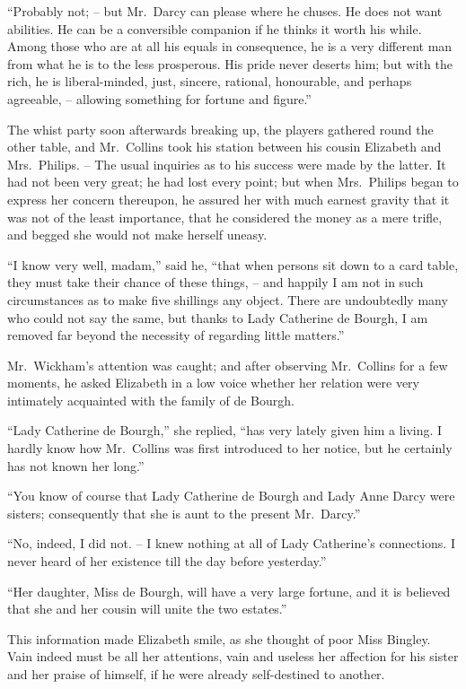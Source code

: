 “Probably not; -- but Mr.\ Darcy can please where he
chuses. He does not want abilities. He can be a conversible
companion if he thinks it worth his while. Among
those who are at all his equals in consequence, he is a very
different man from what he is to the less prosperous.
His pride never deserts him; but with the rich, he is
liberal-minded, just, sincere, rational, honourable, and
perhaps agreeable, -- allowing something for fortune and
figure.”

The whist party soon afterwards breaking up, the players
gathered round the other table, and Mr.\ Collins took his
station between his cousin Elizabeth and Mrs.\ Philips. -- The
usual inquiries as to his success were made by the latter.
It had not been very great; he had lost every point;
but when Mrs.\ Philips began to express her concern thereupon,
he assured her with much earnest gravity that it
was not of the least importance, that he considered the
money as a mere trifle, and begged she would not make
herself uneasy.

“I know very well, madam,” said he, “that when
persons sit down to a card table, they must take their
chance of these things, -- and happily I am not in such
circumstances as to make five shillings any object. There
are undoubtedly many who could not say the same, but
thanks to Lady Catherine de Bourgh, I am removed far
beyond the necessity of regarding little matters.”

Mr.\ Wickham’s attention was caught; and after observing
Mr.\ Collins for a few moments, he asked Elizabeth in
a low voice whether her relation were very intimately
acquainted with the family of de Bourgh.

“Lady Catherine de Bourgh,” she replied, “has very
lately given him a living. I hardly know how Mr.\ Collins
was first introduced to her notice, but he certainly has
not known her long.”

“You know of course that Lady Catherine de Bourgh
and Lady Anne Darcy were sisters; consequently that
she is aunt to the present Mr.\ Darcy.”

“No, indeed, I did not. -- I knew nothing at all of Lady
Catherine’s connections. I never heard of her existence
till the day before yesterday.”

“Her daughter, Miss de Bourgh, will have a very large
fortune, and it is believed that she and her cousin will
unite the two estates.”

This information made Elizabeth smile, as she thought
of poor Miss Bingley. Vain indeed must be all her attentions,
vain and useless her affection for his sister and her
praise of himself, if he were already self-destined to
another.

